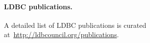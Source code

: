 


\paragraph*{LDBC publications.}

A detailed list of LDBC publications is curated at~\url{http://ldbcouncil.org/publications}.
